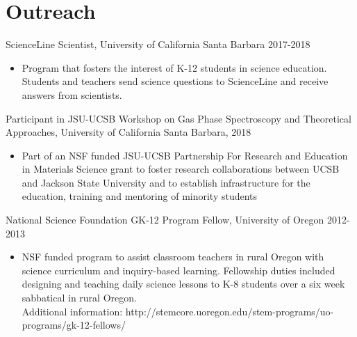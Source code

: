 \documentclass[10pt]{article} %
\begin{document}
\section{Outreach}
ScienceLine Scientist, University of California Santa Barbara 2017-2018 \\
\begin{itemize}
\item Program that fosters the interest of K-12 students in science education. Students and teachers send science questions to ScienceLine and receive answers from scientists. 
\end{itemize}
Participant in JSU-UCSB Workshop on Gas Phase Spectroscopy and Theoretical Approaches, University of California Santa Barbara, 2018 \\
\begin{itemize}
\item Part of an NSF funded JSU-UCSB Partnership For Research and Education in Materials Science grant to foster research collaborations between UCSB and Jackson State University and to establish infrastructure for the education, training and mentoring of minority students
\end{itemize}
National Science Foundation GK-12 Program Fellow, University of Oregon 2012-2013 \\
\begin{itemize}
\item NSF funded program to assist classroom teachers in rural Oregon with science curriculum and inquiry-based learning. Fellowship duties included designing and teaching daily science lessons to K-8 students over a six week sabbatical in rural Oregon. \\
Additional information: http://stemcore.uoregon.edu/stem-programs/uo-programs/gk-12-fellows/
\end{itemize}
\end{document}

